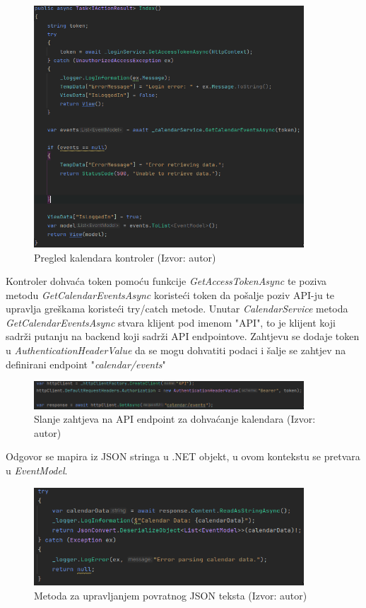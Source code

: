 \documentclass{foi}
\begin{document}
\begin{figure}[H]
    \centering
    \includegraphics[width=0.9\textwidth]{slike/cControllerIndex.png}
    \caption{Pregled kalendara kontroler (Izvor: autor)}
    \label{fig:ctrl}

\end{figure}
Kontroler dohvaća token pomoću funkcije \textit{GetAccessTokenAsync} te poziva metodu \textit{GetCalendarEventsAsync} koristeći token da pošalje poziv API-ju te upravlja greškama koristeći try/catch metode. 
Unutar \textit{CalendarService} metoda \textit{GetCalendarEventsAsync} stvara klijent pod imenom "API", to je klijent koji sadrži putanju na backend koji sadrži API endpointove.
Zahtjevu se dodaje token u \textit{AuthenticationHeaderValue} da se mogu dohvatiti podaci i šalje se zahtjev na definirani endpoint "\textit{calendar/events}"
\begin{figure}[H]
    \centering
    \includegraphics[width=0.9\textwidth]{slike/calendarRequest.png}
    \caption{Slanje zahtjeva na API endpoint za dohvaćanje kalendara (Izvor: autor)}
    \label{fig:calendarRequest}

\end{figure}
Odgovor se mapira iz JSON stringa u .NET objekt, u ovom kontekstu se pretvara u \textit{EventModel}.
\begin{figure}[H]
    \centering
    \includegraphics[width=0.9\textwidth]{slike/calendarReturn.png}
    \caption{Metoda za upravljanjem povratnog JSON teksta (Izvor: autor)}
    \label{fig:calendarReturnList}

\end{figure}
\end{document}
